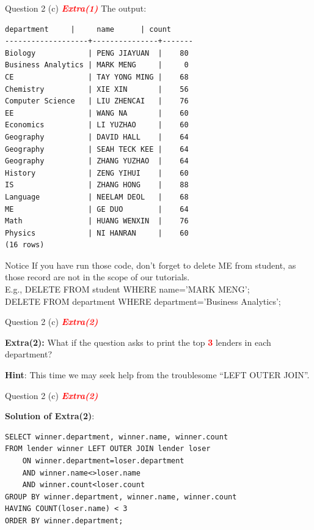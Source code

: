 \begin{frame}[fragile]{Question 2 (c) \textcolor{red}{\textit{\textbf{Extra(1)}}}}
The output:

\begin{lstlisting}[style=terminal-tiny]
    department     |     name      | count 
-------------------+---------------+-------
Biology            | PENG JIAYUAN  |    80
Business Analytics | MARK MENG     |     0
CE                 | TAY YONG MING |    68
Chemistry          | XIE XIN       |    56
Computer Science   | LIU ZHENCAI   |    76
EE                 | WANG NA       |    60
Economics          | LI YUZHAO     |    60
Geography          | DAVID HALL    |    64
Geography          | SEAH TECK KEE |    64
Geography          | ZHANG YUZHAO  |    64
History            | ZENG YIHUI    |    60
IS                 | ZHANG HONG    |    88
Language           | NEELAM DEOL   |    68
ME                 | GE DUO        |    64
Math               | HUANG WENXIN  |    76
Physics            | NI HANRAN     |    60
(16 rows)
\end{lstlisting}

\begin{alertblock}{Notice}
	If you have run those code, don't forget to delete ME from student, as those record are not in the scope of our tutorials.\\
	E.g., DELETE FROM student WHERE name='MARK MENG';\\
	DELETE FROM department WHERE department='Business Analytics';
\end{alertblock}
\end{frame}

\begin{frame}[fragile]{Question 2 (c) \textcolor{red}{\textit{\textbf{Extra(2)}}}}
	
\textbf{Extra(2):} What if the question asks to print the top \textcolor{red}{\textbf{3}} lenders in each department?

\textbf{Hint}: This time we may seek help from the troublesome ``LEFT OUTER JOIN''.
\end{frame}

\begin{frame}[fragile]{Question 2 (c) \textcolor{red}{\textit{\textbf{Extra(2)}}}}
	
\textbf{Solution of Extra(2)}:
\begin{lstlisting}
SELECT winner.department, winner.name, winner.count 
FROM lender winner LEFT OUTER JOIN lender loser
	ON winner.department=loser.department 
	AND winner.name<>loser.name 
	AND winner.count<loser.count
GROUP BY winner.department, winner.name, winner.count 
HAVING COUNT(loser.name) < 3
ORDER BY winner.department;
\end{lstlisting}
 
\end{frame}


